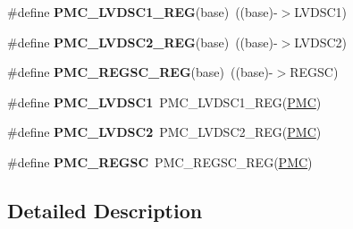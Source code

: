 \begin{DoxyCompactItemize}
\item 
\#define {\bfseries P\+M\+C\+\_\+\+L\+V\+D\+S\+C1\+\_\+\+R\+EG}(base)~((base)-\/$>$L\+V\+D\+S\+C1)\hypertarget{group__PMC__Register__Accessor__Macros_gaf6a5650ee275b48943fd2a5f0845be4e}{}\label{group__PMC__Register__Accessor__Macros_gaf6a5650ee275b48943fd2a5f0845be4e}

\item 
\#define {\bfseries P\+M\+C\+\_\+\+L\+V\+D\+S\+C2\+\_\+\+R\+EG}(base)~((base)-\/$>$L\+V\+D\+S\+C2)\hypertarget{group__PMC__Register__Accessor__Macros_ga691e6102ace21a6b54fabd256c5f0d7b}{}\label{group__PMC__Register__Accessor__Macros_ga691e6102ace21a6b54fabd256c5f0d7b}

\item 
\#define {\bfseries P\+M\+C\+\_\+\+R\+E\+G\+S\+C\+\_\+\+R\+EG}(base)~((base)-\/$>$R\+E\+G\+SC)\hypertarget{group__PMC__Register__Accessor__Macros_ga56808559a3b60498b6604642202faaea}{}\label{group__PMC__Register__Accessor__Macros_ga56808559a3b60498b6604642202faaea}

\item 
\#define {\bfseries P\+M\+C\+\_\+\+L\+V\+D\+S\+C1}~P\+M\+C\+\_\+\+L\+V\+D\+S\+C1\+\_\+\+R\+EG(\hyperlink{group__PMC__Peripheral__Access__Layer_ga979c6d379c67bc2f3e8eb6efcb509f69}{P\+MC})\hypertarget{group__PMC__Register__Accessor__Macros_gae9e90b7b2d3c4f5e0950d074fecb2798}{}\label{group__PMC__Register__Accessor__Macros_gae9e90b7b2d3c4f5e0950d074fecb2798}

\item 
\#define {\bfseries P\+M\+C\+\_\+\+L\+V\+D\+S\+C2}~P\+M\+C\+\_\+\+L\+V\+D\+S\+C2\+\_\+\+R\+EG(\hyperlink{group__PMC__Peripheral__Access__Layer_ga979c6d379c67bc2f3e8eb6efcb509f69}{P\+MC})\hypertarget{group__PMC__Register__Accessor__Macros_ga921b48d20e5bc7e7353ac2f59c8135ba}{}\label{group__PMC__Register__Accessor__Macros_ga921b48d20e5bc7e7353ac2f59c8135ba}

\item 
\#define {\bfseries P\+M\+C\+\_\+\+R\+E\+G\+SC}~P\+M\+C\+\_\+\+R\+E\+G\+S\+C\+\_\+\+R\+EG(\hyperlink{group__PMC__Peripheral__Access__Layer_ga979c6d379c67bc2f3e8eb6efcb509f69}{P\+MC})\hypertarget{group__PMC__Register__Accessor__Macros_gad80edb8f69da1769b7367108d8c4f9be}{}\label{group__PMC__Register__Accessor__Macros_gad80edb8f69da1769b7367108d8c4f9be}

\end{DoxyCompactItemize}


\subsection{Detailed Description}
